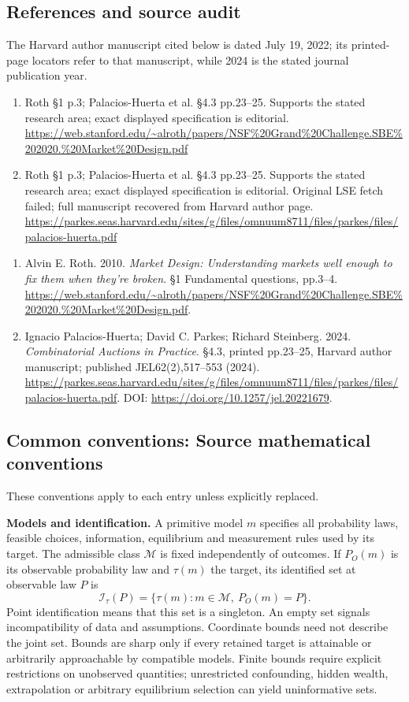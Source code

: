 \documentclass[11pt,a4paper]{article}
\begin{document}
\subsection*{References and source audit}
The Harvard author manuscript cited below is dated July 19, 2022; its printed-page locators refer to that manuscript, while 2024 is the stated journal publication year.
\begin{enumerate}
\item Roth §1 p.3; Palacios-Huerta et al. §4.3 pp.23–25. Supports the stated research area; exact displayed specification is editorial. \url{https://web.stanford.edu/~alroth/papers/NSF%20Grand%20Challenge.SBE%202020.%20Market%20Design.pdf}
\item Roth §1 p.3; Palacios-Huerta et al. §4.3 pp.23–25. Supports the stated research area; exact displayed specification is editorial. Original LSE fetch failed; full manuscript recovered from Harvard author page. \url{https://parkes.seas.harvard.edu/sites/g/files/omnuum8711/files/parkes/files/palacios-huerta.pdf}
\end{enumerate}
\begin{enumerate}\raggedright
\item\hypertarget{definitions:source:30007576:1}{} Alvin E. Roth. 2010. \emph{Market Design: Understanding markets well enough to fix them when they’re broken}. §1 Fundamental questions, pp.3–4.
\url{https://web.stanford.edu/~alroth/papers/NSF%20Grand%20Challenge.SBE%202020.%20Market%20Design.pdf}.
\item\hypertarget{definitions:source:30007576:2}{} Ignacio Palacios-Huerta; David C. Parkes; Richard Steinberg. 2024. \emph{Combinatorial Auctions in Practice}. §4.3, printed pp.23–25, Harvard author manuscript; published JEL62(2),517–553 (2024).
\url{https://parkes.seas.harvard.edu/sites/g/files/omnuum8711/files/parkes/files/palacios-huerta.pdf}.
DOI: \url{https://doi.org/10.1257/jel.20221679}.
\end{enumerate}

\subsection*{Common conventions: Source mathematical conventions}

These conventions apply to each entry unless explicitly replaced.

\textbf{Models and identification.} A primitive model \(m\) specifies all probability laws, feasible choices, information, equilibrium and measurement rules used by its target. The admissible class \(\mathcal M\) is fixed independently of outcomes. If \(P_O(m)\) is its observable probability law and \(\tau(m)\) the target, its identified set at observable law \(P\) is
\[
 \mathcal I_\tau(P)=\{\tau(m):m\in\mathcal M,\ P_O(m)=P\}.
\]
Point identification means that this set is a singleton. An empty set signals incompatibility of data and assumptions. Coordinate bounds need not describe the joint set. Bounds are sharp only if every retained target is attainable or arbitrarily approachable by compatible models. Finite bounds require explicit restrictions on unobserved quantities; unrestricted confounding, hidden wealth, extrapolation or arbitrary equilibrium selection can yield uninformative sets.
\end{document}
